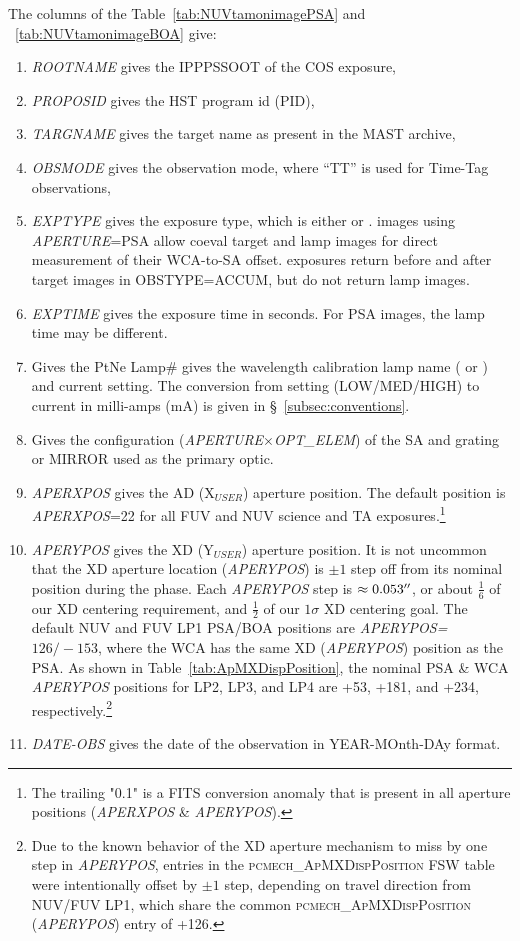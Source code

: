 The columns of the Table~\ref{tab:NUVtamonimagePSA} and ~\ref{tab:NUVtamonimageBOA} give:
\footnotesize
\begin{enumerate}
\item \textit{ROOTNAME} gives the IPPPSSOOT of the COS exposure,
\item \textit{PROPOSID} gives the HST program id (PID),
\item \textit{TARGNAME} gives the target name as present in the MAST archive,
\item \textit{OBSMODE} gives the observation mode, where ``TT'' is used for Time-Tag observations,
\item \textit{EXPTYPE} gives the exposure type, which is either  or \extsci. \extsci{} images using \textit{APERTURE}=PSA allow coeval target and lamp images for
direct measurement of their WCA-to-SA offset.  exposures return before and after target images in \textsc{OBSTYPE}=ACCUM, but do not return lamp images.
\item \textit{EXPTIME} gives the exposure time in seconds. For \extsci{} PSA images, the lamp time may be different.
\item Gives the PtNe Lamp\# gives the wavelength calibration lamp name (\plampone{} or \plamptwo{}) and current setting. The conversion from setting (LOW/MED/HIGH) to current in milli-amps (mA) is given in \S~\ref{subsec:conventions}.
\item Gives the configuration (\textit{APERTURE}$\times$\textit{OPT\_ELEM}) of the SA and grating or MIRROR used as the primary optic.
\item \textit{APERXPOS} gives the AD (X$_{USER}$) aperture position. The default position is \textit{APERXPOS}=22 for all FUV and NUV science and TA exposures.\footnote{The trailing "0.1" is a FITS conversion anomaly that is present in all aperture positions (\textit{APERXPOS} \& \textit{APERYPOS}).}
\item \textit{APERYPOS} gives the XD (Y$_{USER}$) aperture position. It is not uncommon that the XD aperture location (\textit{APERYPOS}) is $\pm 1$ step off from its nominal position during the  phase. Each \textit{APERYPOS} step is $\approx0.053\hbox{$^{\prime\prime}$}$, or about $\frac{1}{6}$ of
our XD centering requirement, and $\frac{1}{2}$ of our $1\sigma$ XD centering goal. The default NUV and FUV LP1 PSA/BOA positions are \textit{APERYPOS=$126/-153$}, where the WCA has the same XD (\textit{APERYPOS}) position as the PSA.
As shown in Table~\ref{tab:ApMXDispPosition}, the nominal PSA \& WCA \textit{APERYPOS} positions for LP2, LP3, and LP4 are +53, +181, and +234, respectively.\footnote{Due
to the known behavior of the XD aperture mechanism to miss by one step in \textit{APERYPOS}, entries in the \textsc{pcmech\_ApMXDispPosition} FSW table were intentionally offset by $\pm 1$ step, depending on travel direction from NUV/FUV LP1, which
share the common \textsc{pcmech\_ApMXDispPosition} (\textit{APERYPOS}) entry of +126.}
\item \textit{DATE-OBS} gives the date of the observation in YEAR-MOnth-DAy format.
\end{enumerate}
\normalsize

